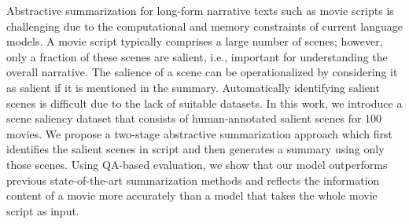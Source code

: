 Abstractive summarization for long-form narrative texts such as movie scripts is challenging due to the computational and memory constraints of current language models. A movie script typically comprises a large number of scenes; however, only a fraction of these scenes are salient, i.e., important for understanding the overall narrative. The salience of a scene can be operationalized by considering it as salient if it is mentioned in the summary. Automatically identifying salient scenes is difficult due to the lack of suitable datasets. In this work, we introduce a scene saliency dataset that consists of human-annotated salient scenes for 100 movies. We propose a two-stage abstractive summarization approach which first identifies the salient scenes in script and then generates a summary using only those scenes. Using QA-based evaluation, we show that our model outperforms previous state-of-the-art summarization methods and reflects the information content of a movie more accurately than a model that takes the whole movie script as input.